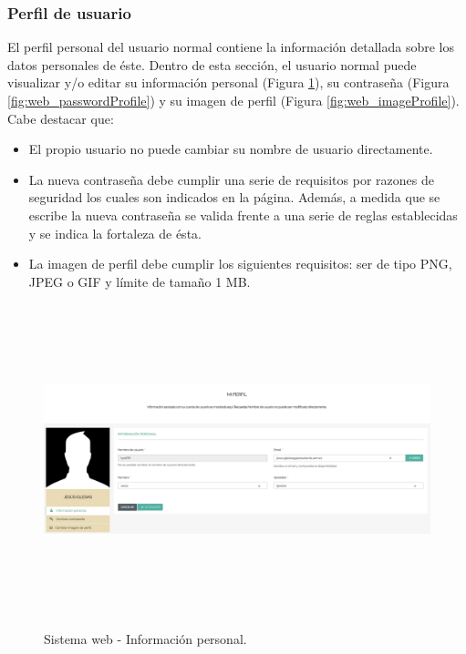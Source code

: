\documentclass[12pt,a4paper, twoside]{report}
\begin{document}
	\subsubsection{Perfil de usuario}
	
	El perfil personal del usuario normal contiene la información detallada sobre los datos personales de éste. Dentro de esta sección, el usuario normal puede visualizar y/o editar su información personal (Figura \ref{fig:web_profile}), su contraseña (Figura \ref{fig:web_passwordProfile}) y su imagen de perfil (Figura \ref{fig:web_imageProfile}). Cabe destacar que:
	
	\begin{itemize}
		\item El propio usuario no puede cambiar su nombre de usuario directamente.
		\item La nueva contraseña debe cumplir una serie de requisitos por razones de seguridad los cuales son indicados en la página. Además, a medida que se escribe la nueva contraseña se valida frente a una serie de reglas establecidas y se indica la fortaleza de ésta.
		\item La imagen de perfil debe cumplir los siguientes requisitos: ser de tipo PNG, JPEG o GIF y límite de tamaño 1 MB.
	\end{itemize}
	 	
	 \begin{figure}[!ht]   
		\caption{Sistema web - Información personal.} 
		\begin{center} 
			\includegraphics[width=16cm, height=9cm]{Images/userGuide/web/profile} \\
			\label{fig:web_profile} 
		\end{center}  	
	\end{figure}
	
\end{document}
